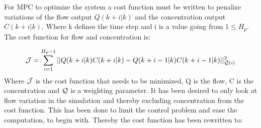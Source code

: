 
For MPC to optimize the system a cost function must be written to penalize variations of the flow output $Q(k+i|k)$ and the concentration output $C(k+i|k)$. Where k defines the time step and i is a value going from $1\leq H_p$. The cost function for flow and concentration is:

\begin{equation}
	 \CMcal{J} = \sum_{i=1}^{H_p-1} || Q(k+i|k)C(k+i|k)-Q(k+i-1|k)C(k+i-1|k)||_{\CMcal{Q}(i)}^2
\end{equation}
Where $\CMcal{J}$ is the cost function that needs to be minimized, Q is the flow, C is the concentration and $\CMcal{Q}$ is a weighting parameter. It has been desired to only look at flow variation in the simulation and thereby excluding concentration from the cost function. This has been done to limit the control problem and ease the computation, to begin with. Thereby the cost function has been rewritten to: 

